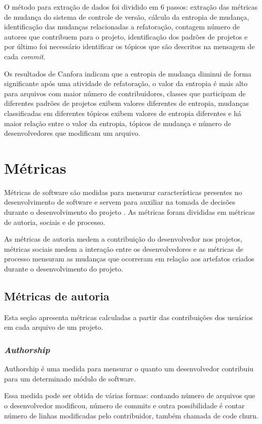 O método para extração de dados foi dividido em 6 passos: extração das métricas de mudança do sistema de controle de versão, cálculo da entropia de mudança, identificação das mudanças relacionadas a refatoração, contagem número de autores que contribuem para o projeto, identificação dos padrões de projetos e por último foi necessário identificar os tópicos que são descritos na mensagem de cada \textit{commit}. 

Os resultados de Canfora indicam que a entropia de mudança diminui de forma significante após uma atividade de refatoração, o valor da entropia é mais alto para arquivos com maior número de contribuidores, classes que participam de diferentes padrões de projetos exibem valores diferentes de entropia, mudanças classificadas em diferentes tópicos exibem valores de entropia diferentes e há maior relação entre o valor da entropia, tópicos de mudança e número de desenvolvedores que modificam um arquivo. 

\section{Métricas}
Métricas de software são medidas para mensurar características presentes no desenvolvimento de software e servem para auxiliar na tomada de decisões durante o desenvolvimento do projeto \cite{koscianski2007qualidade}. As métricas foram divididas em métricas de autoria, sociais e de processo. 

As métricas de autoria medem a contribuição do desenvolvedor nos projetos, métricas sociais medem a interação entre os desenvolvedores e as métricas de processo mensuram as mudanças que ocorreram em relação aos artefatos criados durante o desenvolvimento do projeto.

\subsection{Métricas de autoria}
Esta seção apresenta métricas calculadas a partir das contribuições dos usuários em cada arquivo de um projeto.

\subsubsection{\textit{Authorship}}
Authorship é uma medida para mensurar o quanto um desenvolvedor contribuiu para um determinado módulo de software.

Essa medida pode ser obtida de várias formas: contando número de arquivos que o desenvolvedor modificou, número de commits e outra possibilidade é contar número de linhas modificadas pelo contribuidor, também chamada de code churn\cite{Munson:1998:CCM:850947.853326}.

